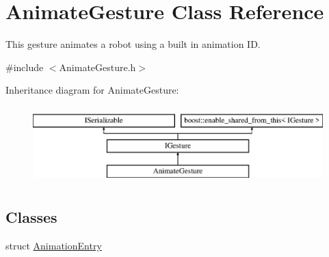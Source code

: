 \hypertarget{class_animate_gesture}{}\section{Animate\+Gesture Class Reference}
\label{class_animate_gesture}


This gesture animates a robot using a built in animation ID.  




{\ttfamily \#include $<$Animate\+Gesture.\+h$>$}

Inheritance diagram for Animate\+Gesture\+:\begin{figure}[H]
\begin{center}
\leavevmode
\includegraphics[height=3.000000cm]{class_animate_gesture}
\end{center}
\end{figure}
\subsection*{Classes}
\begin{DoxyCompactItemize}
\item 
struct \hyperlink{struct_animate_gesture_1_1_animation_entry}{Animation\+Entry}
\end{DoxyCompactItemize}

